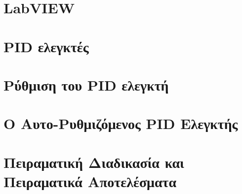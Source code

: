 \documentclass[a4paper,11pt,twoside]{book}
\author{\me}
\begin{document}
\setcounter{page}{3}



\clearemptydoublepage



\clearemptydoublepage



\clearemptydoublepage



\clearemptydoublepage



\clearemptydoublepage

\pagestyle{fancy}

\tableofcontents
\clearemptydoublepage

\setcounter{page}{1}


\clearemptydoublepage

\chapter{LabVIEW}\label{ch:chap1}

\clearemptydoublepage

\chapter{PID ελεγκτές}\label{ch:chap2}

\clearemptydoublepage

\chapter{Ρύθμιση του PID ελεγκτή}\label{ch:chap3}

\clearemptydoublepage

\chapter{Ο Αυτο-Ρυθμιζόμενος PID Ελεγκτής}\label{ch:chap4}

\clearemptydoublepage

\chapter{Πειραματική Διαδικασία και Πειραματικά Αποτελέσματα}\label{ch:chap5}

\clearemptydoublepage


\clearemptydoublepage


\end{document}
